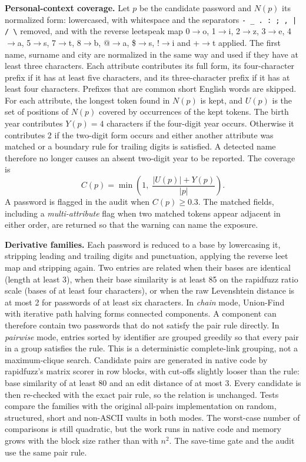 \documentclass[preprint,12pt]{elsarticle}
\begin{document}
\textbf{Personal-context coverage.} Let $p$ be the candidate password and $N(p)$ its normalized form: lowercased, with whitespace and the separators \texttt{- \_ . : ; , | / \textbackslash} removed, and with the reverse leetspeak map 0$\to$o, 1$\to$i, 2$\to$z, 3$\to$e, 4$\to$a, 5$\to$s, 7$\to$t, 8$\to$b, @$\to$a, \$$\to$s, !$\to$i and +$\to$t applied. The first name, surname and city are normalized in the same way and used if they have at least three characters. Each attribute contributes its full form, its four-character prefix if it has at least five characters, and its three-character prefix if it has at least four characters. Prefixes that are common short English words are skipped. For each attribute, the longest token found in $N(p)$ is kept, and $U(p)$ is the set of positions of $N(p)$ covered by occurrences of the kept tokens. The birth year contributes $Y(p)=4$ characters if the four-digit year occurs. Otherwise it contributes 2 if the two-digit form occurs and either another attribute was matched or a boundary rule for trailing digits is satisfied. A detected name therefore no longer causes an absent two-digit year to be reported. The coverage is
\begin{equation}
C(p)=\min\!\left(1,\;\frac{|U(p)|+Y(p)}{|p|}\right).
\label{eq:cov}
\end{equation}
A password is flagged in the audit when $C(p)\geq 0.3$. The matched fields, including a \emph{multi-attribute} flag when two matched tokens appear adjacent in either order, are returned so that the warning can name the exposure.

\textbf{Derivative families.} Each password is reduced to a base by lowercasing it, stripping leading and trailing digits and punctuation, applying the reverse leet map and stripping again. Two entries are related when their bases are identical (length at least 3), when their base similarity is at least 85 on the rapidfuzz ratio scale (bases of at least four characters), or when the raw Levenshtein distance is at most 2 for passwords of at least six characters. In \emph{chain} mode, Union-Find with iterative path halving forms connected components. A component can therefore contain two passwords that do not satisfy the pair rule directly. In \emph{pairwise} mode, entries sorted by identifier are grouped greedily so that every pair in a group satisfies the rule. This is a deterministic complete-link grouping, not a maximum-clique search. Candidate pairs are generated in native code by rapidfuzz's matrix scorer in row blocks, with cut-offs slightly looser than the rule: base similarity of at least 80 and an edit distance of at most 3. Every candidate is then re-checked with the exact pair rule, so the relation is unchanged. Tests compare the families with the original all-pairs implementation on random, structured, short and non-ASCII vaults in both modes. The worst-case number of comparisons is still quadratic, but the work runs in native code and memory grows with the block size rather than with $n^2$. The save-time gate and the audit use the same pair rule.
\end{document}
